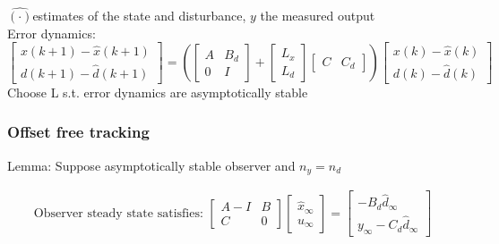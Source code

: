 $\hat{(\cdot)}$\rightarrow estimates of the state and disturbance, $y$ the measured output\\
Error dynamics:\\
$\begin{bmatrix}
    x(k+1)-\hat{x}(k+1)\\
    d(k+1)-\hat{d}(k+1)
\end{bmatrix}=\left(\begin{bmatrix}
    A&B_d\\0&I
\end{bmatrix}+\begin{bmatrix}
    L_x\\L_d
\end{bmatrix}\begin{bmatrix}
    C&C_d
\end{bmatrix}\right)\begin{bmatrix}
    x(k)-\hat{x}(k)\\d(k)-\hat{d}(k)
\end{bmatrix}$\\
\Rightarrow Choose L s.t. error dynamics are asymptotically stable\\


\subsubsection{Offset free tracking}
Lemma: Suppose asymptotically stable observer and $n_y=n_d$\\


\begin{tcolorbox}[eqbox]
\begin{align*}
\text{Observer steady state satisfies: }
\begin{bmatrix}
    A-I&B\\C&0
\end{bmatrix}\begin{bmatrix}
    \hat{x}_\infty\\u_\infty
\end{bmatrix}=\begin{bmatrix}
    -B_d\hat{d}_\infty\\y_\infty-C_d\hat{d}_\infty
\end{bmatrix}
\end{align*}
\end{tcolorbox}

